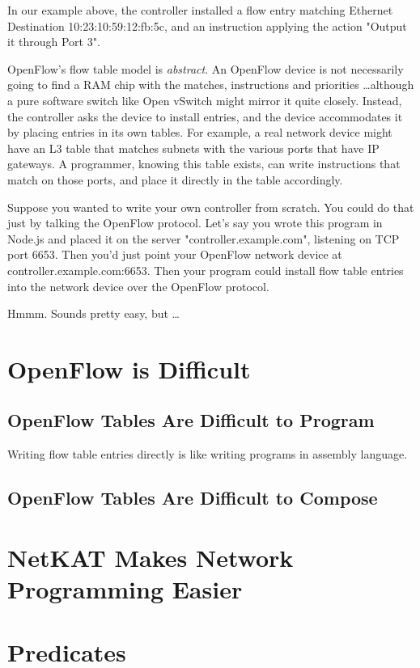 In our example above, the controller installed a flow entry matching Ethernet Destination 10:23:10:59:12:fb:5c, 
and an instruction applying the action "Output it through Port 3".

OpenFlow's flow table model is \textit{abstract}.
An OpenFlow device is not necessarily going to find a RAM chip with the matches, 
instructions and priorities \ldots although a pure software switch like Open vSwitch might mirror it quite closely.
Instead, the controller asks the device to install entries, and the device accommodates it by placing entries in its
own tables.
For example, a real network device might have an L3 table that matches subnets with the various ports that have
IP gateways.
A programmer, knowing this table exists, can write instructions that match on those ports, and place it directly in the
table accordingly.

Suppose you wanted to write your own controller from scratch.  
You could do that just by talking the OpenFlow protocol.
Let's say you wrote this program in Node.js and placed it on the server "controller.example.com", 
listening on TCP port 6653.
Then you'd just point your OpenFlow network device at controller.example.com:6653.
Then your program could install flow table entries into the network device over the OpenFlow protocol.

Hmmm.
Sounds pretty easy, but \ldots

\section{OpenFlow is Difficult}

\subsection{OpenFlow Tables Are Difficult to Program}

Writing flow table entries directly is like writing programs in assembly language.

\subsection{OpenFlow Tables Are Difficult to Compose}

\section{NetKAT Makes Network Programming Easier}

\section{Predicates}

